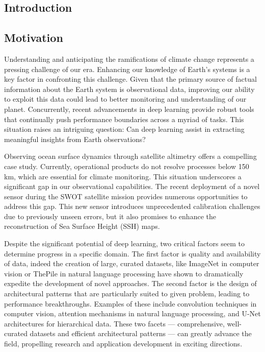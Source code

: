 \begin{bibunit}

\chapter*{Introduction}


\section*{Motivation}

Understanding and anticipating the ramifications of climate change represents a pressing challenge of our era. Enhancing our knowledge of Earth's systems is a key factor in confronting this challenge. Given that the primary source of factual information about the Earth system is observational data, improving our ability to exploit this data could lead to better monitoring and understanding of our planet. Concurrently, recent advancements in deep learning provide robust tools that continually push performance boundaries across a myriad of tasks. This situation raises an intriguing question: Can deep learning assist in extracting meaningful insights from Earth observations?

Observing ocean surface dynamics through satellite altimetry offers a compelling case study. Currently, operational products do not resolve processes below 150 km, which are essential for climate monitoring. This situation underscores a significant gap in our observational capabilities. The recent deployment of a novel sensor during the SWOT satellite mission provides numerous opportunities to address this gap. This new sensor introduces unprecedented calibration challenges due to previously unseen errors, but it also promises to enhance the reconstruction of Sea Surface Height (SSH) maps.

Despite the significant potential of deep learning, two critical factors seem to determine progress in a specific domain. The first factor is quality and availability of data, indeed the creation of large, curated datasets, like ImageNet in computer vision or ThePile in natural language processing have shown to dramatically expedite the development of novel approaches. The second factor is the design of architectural patterns that are particularly suited to given problem, leading to performance breakthroughs. Examples of these include convolution techniques in computer vision, attention mechanisms in natural language processing, and U-Net architectures for hierarchical data. These two facets — comprehensive, well-curated datasets and efficient architectural patterns — can greatly advance the field, propelling research and application development in exciting directions.


\end{bibunit}
